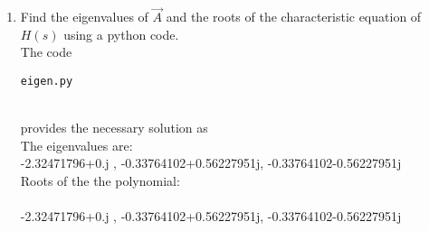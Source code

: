 \begin{enumerate}[label=\thesection.\arabic*.,ref=\thesection.\theenumi]
\item Find the eigenvalues of $\vec{A}$ and the roots of the characteristic equation of $H(s)$ using a python code.
\\
\solution
The code 
\begin{lstlisting}
eigen.py
\end{lstlisting}\\
provides the necessary solution as\\
The eigenvalues are:
\\-2.32471796+0.j , -0.33764102+0.56227951j, -0.33764102-0.56227951j\\
Roots of the the polynomial:\\
\\-2.32471796+0.j , -0.33764102+0.56227951j, -0.33764102-0.56227951j\\
\end{enumerate}

